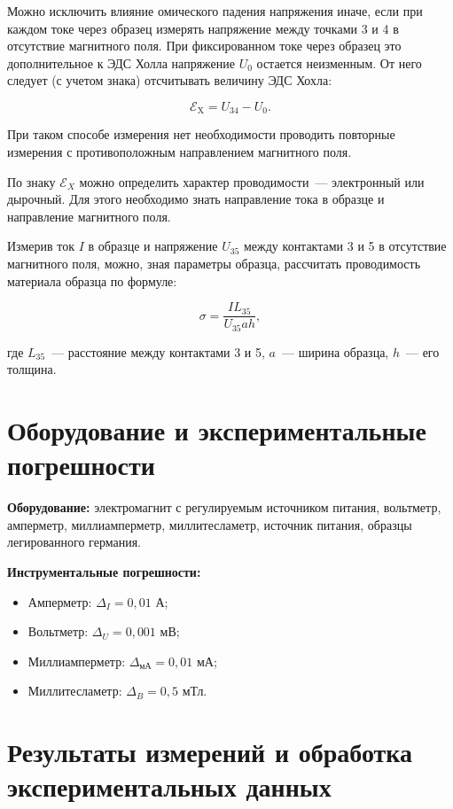 \documentclass[a4paper,12pt]{article} %
\begin{document}
Можно исключить влияние омического падения напряжения иначе, если при каждом токе через образец измерять напряжение между точками 3 и 4 в отсутствие магнитного поля. При фиксированном токе через образец это дополнительное к ЭДС Холла напряжение $U_{0}$ остается неизменным. От него следует (с учетом
знака) отсчитывать величину ЭДС Хохла: 
  	
$$\mathscr{E}_\text{X} = U_{34} - U_{0}.$$
  	
При таком способе измерения нет необходимости проводить повторные измерения с противоположным направлением магнитного поля.
  	
По знаку $\mathscr{E}_{X}$ можно определить характер проводимости~--- электронный или дырочный. Для этого необходимо знать направление тока в образце и направление
магнитного поля.
  	
Измерив ток $I$ в образце и напряжение $U_{35}$ между контактами 3 и 5 в отсутствие магнитного поля, можно, зная параметры образца, рассчитать проводимость материала образца по формуле:
  	
\begin{equation}\label{sigma}
  \sigma=\dfrac{IL_{35}}{U_{35}ah},
\end{equation}
  	
где $L_{35}$~--- расстояние между контактами 3 и 5, $a$~--- ширина образца, $h$~--- его толщина.
  	
\section{Оборудование и экспериментальные погрешности}

\textbf{Оборудование:} электромагнит с регулируемым источником питания, вольтметр, амперметр, миллиамперметр, миллитесламетр, источник питания, образцы легированного германия.

\textbf{Инструментальные погрешности:}

\begin{itemize}
    \item Амперметр: $\Delta_I = 0,01$ А;
    \item Вольтметр: $\Delta_U = 0,001$ мВ;
    \item Миллиамперметр: $\Delta_\text{мА} = 0,01$ мА;
    \item Миллитесламетр: $\Delta_B = 0,5$ мТл.
\end{itemize}

\section{Результаты измерений и обработка экспериментальных данных}
\end{document}
